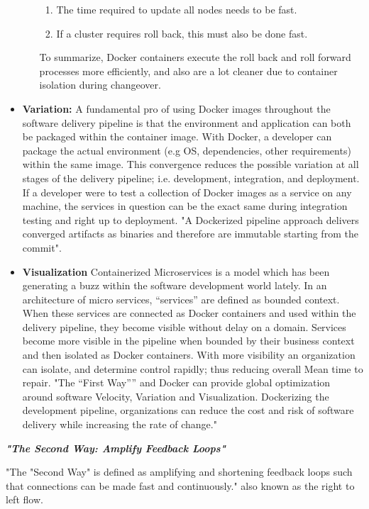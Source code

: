 \begin{itemize}
\begin{itemize}
	\begin{enumerate}
		\item The time required to update all nodes needs to be fast.
    	\item If a cluster requires roll back, this must also be done fast.  
	\end{enumerate}
    To summarize, Docker containers execute the roll back and roll forward processes more efficiently, and also are a lot cleaner due to container isolation during changeover.
	\end{itemize}
\item \textbf{Variation:}
	A fundamental pro of using Docker images throughout the software delivery pipeline is that the environment and application can both be packaged within the container image. With Docker, a developer can package the actual environment (e.g OS, dependencies, other requirements) within the same image. This convergence reduces the possible variation at all stages of the delivery pipeline; i.e. development, integration, and  deployment\cite{willis}. If a developer were to test a collection of Docker images as a service on any machine, the services in question can be the exact same during integration testing and right up to deployment. "A Dockerized pipeline approach delivers converged artifacts as binaries and therefore are immutable starting from the commit"\cite{willis}.
\item \textbf{Visualization}
	Containerized Microservices is a model which has been generating a buzz within the software development world lately. In an architecture of micro services, “services” are defined as bounded context. When these services are connected as Docker containers and used within the delivery pipeline, they become visible without delay on a domain. Services become more visible in the pipeline when bounded by their business context and then isolated as Docker containers. With more visibility an organization can isolate, and determine control rapidly; thus reducing overall Mean time to repair\cite{willis}.
    "The “First Way”” and Docker can provide global optimization around software Velocity, Variation and Visualization. Dockerizing the development pipeline, organizations can reduce the cost and risk of software delivery while increasing the rate of change."\cite{willis} 
\end{itemize}

\textbf{\emph{"The Second Way: Amplify Feedback Loops"}}

"The "Second Way" is defined as amplifying and shortening feedback loops such that connections can be made fast and continuously."\cite{willis} also known as the right to left flow.

